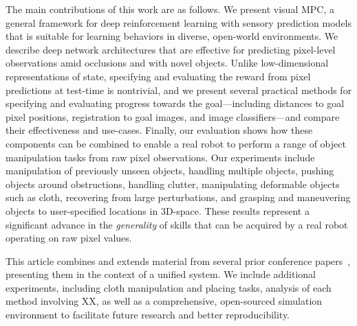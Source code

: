 The main contributions of this work are as follows. We present visual MPC, a general framework for deep reinforcement learning with sensory prediction models that is suitable for learning behaviors in diverse, open-world environments.
We describe deep network architectures that are effective for predicting pixel-level observations amid occlusions and with novel objects. Unlike low-dimensional representations of state, specifying and evaluating the reward from pixel predictions at test-time is nontrivial, and we present several practical methods for specifying and evaluating progress towards the goal---including distances to goal pixel positions, registration to goal images, and image classifiers---and compare their effectiveness and use-cases.
Finally, our evaluation shows how these components can be combined to enable a real robot to perform a range of object manipulation tasks from raw pixel observations. Our experiments include manipulation of previously unseen objects, handling multiple objects, pushing objects around obstructions, handling clutter, manipulating deformable objects such as cloth, recovering from large perturbations, and grasping and maneuvering objects to user-specified locations in 3D-space. These results represent a significant advance in the \emph{generality} of skills that can be acquired by a real robot operating on raw pixel values.

This article combines and extends material from several prior conference papers~\cite{foresight,sna,ebert2018robustness,flo}, presenting them in the context of a unified system. We include additional experiments, including cloth manipulation and placing tasks, analysis of each method involving XX, as well as a comprehensive, open-sourced simulation environment to facilitate future research and better reproducibility.





 





